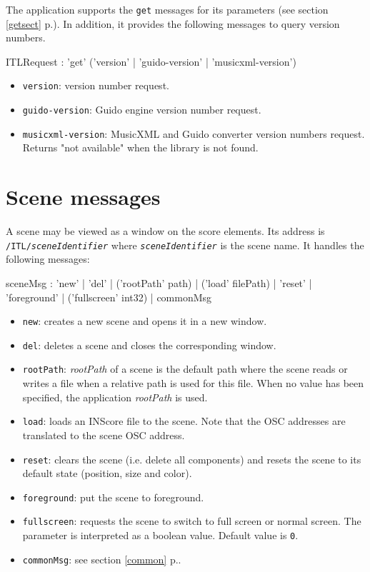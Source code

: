 \documentclass[a4paper,twoside]{report}
\newcommand{\toplevel}[1]	{\chapter{#1}}
\newcommand{\fullref}[1]	{\ref{#1} p.\pageref{#1}}
\newcommand{\OSC}[1]		{\texttt{#1}}
\newcommand{\values}[1]	{\texttt{#1}}
\begin{document}
The application supports the \OSC{get} messages for its parameters (see section \fullref{getsect}). In addition, it provides the following messages to query version numbers.

\begin{rail}
ITLRequest : 'get'  ('version' | 'guido-version' | 'musicxml-version')
\end{rail}

\begin{itemize}
\item \OSC{version}: version number request.
\item \OSC{guido-version}: Guido engine version number request.
\item \OSC{musicxml-version}: MusicXML and Guido converter version numbers request. Returns "not available" when the library is not found.

\end{itemize}



\toplevel{Scene messages}
\label{scene}
A scene may be viewed as a window on the score elements. Its address is \OSC{/ITL/\textit{sceneIdentifier}} where \OSC{\textit{sceneIdentifier}} is the scene name. It handles the following messages:
\begin{rail}
sceneMsg :  'new'
			| 'del'
			| ('rootPath' path) 
			| ('load' filePath)
			| 'reset'
			| 'foreground'
			| ('fullscreen' int32)
			| commonMsg
\end{rail}

\begin{itemize}
\item \OSC{new}: creates a new scene and opens it in a new window.
\item \OSC{del}: deletes a scene and closes the corresponding window.
\item \OSC{rootPath}: \emph{rootPath} of a scene is the default path where the scene reads or writes a file when a relative path is used for this file. When no value has been specified, the application  \emph{rootPath} is used.
\item \OSC{load}: loads an INScore file to the scene. Note that the OSC addresses are translated to the scene OSC address.
\item \OSC{reset}: clears the scene (i.e. delete all components) and resets the scene to its default state (position, size and color).
\item \OSC{foreground}: put the scene to foreground.
\item \OSC{fullscreen}: requests the scene to switch to full screen or normal screen.  The parameter is interpreted as a boolean value. Default value is \values{0}.
\item \OSC{commonMsg}: see section \fullref{common}.
\end{itemize}
\end{document}
